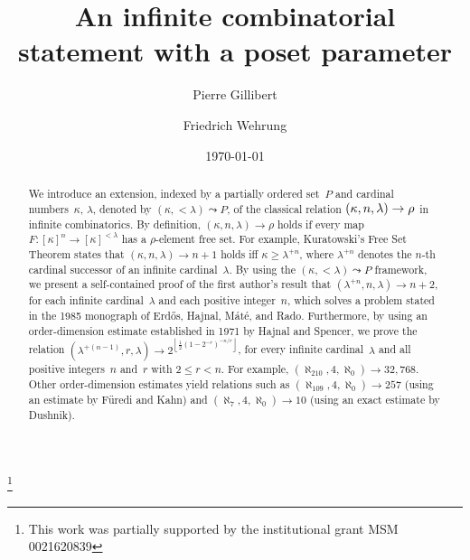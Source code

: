\documentclass[psamsfonts,reqno]{amsart}
\theoremstyle{plain}
\theoremstyle{definition}
\theoremstyle{remark}
\numberwithin{equation}{section}
\numberwithin{figure}{section}
\newcommand{\gk}{\kappa}
\newcommand{\gl}{\lambda}
\newcommand{\gr}{\rho}
\newcommand{\intgr}[1]{\left\lfloor{#1}\right\rfloor}
\begin{document}
\title{An infinite combinatorial statement with a poset parameter}

\author[P.~Gillibert]{Pierre Gillibert}
\author[F.~Wehrung]{Friedrich Wehrung}
\address{LMNO, CNRS UMR 6139\\
D\'epartement de Math\'ematiques, BP 5186\\
Universit\'e de Caen, Campus 2\\
14032 Caen cedex\\
France}


\date{\today}



\thanks{This work was partially supported by the institutional grant MSM 0021620839}

\begin{abstract}
We introduce an extension, indexed by a partially ordered set~$P$ and cardinal numbers~$\gk$, $\gl$, denoted by $(\gk,{<}\gl)\leadsto P$, of the classical relation $(\gk,n,\gl)\rightarrow\nobreak\rho$ in infinite combinatorics. By definition, $(\gk,n,\gl)\rightarrow\gr$ holds if every map $F\colon[\gk]^n\to[\gk]^{<\gl}$ has a $\gr$-element free set. For example, Kuratowski's Free Set Theorem states that $(\gk,n,\gl)\rightarrow n+1$ holds if{f} $\gk\geq\gl^{+n}$, where $\gl^{+n}$ denotes the $n$-th cardinal successor of an infinite cardinal~$\gl$. By using the $(\gk,{<}\gl)\leadsto P$ framework, we present a self-contained proof of the first author's result that $(\gl^{+n},n,\gl)\rightarrow n+2$, for each infinite cardinal~$\gl$ and each positive integer~$n$, which solves a problem stated in the 1985 monograph of Erd\H{o}s, Hajnal, M\'at\'e, and Rado. Furthermore, by using an order-dimension estimate established in 1971 by Hajnal and Spencer, we prove the relation $(\gl^{+(n-1)},r,\gl)\rightarrow2^{\intgr{\frac{1}{2}(1-2^{-r})^{-n/r}}}$, for every infinite cardinal~$\gl$ and all positive integers~$n$ and~$r$ with $2\leq r<n$. For example, $(\aleph_{210},4,\aleph_0)\rightarrow 32{,}768$. Other order-dimension estimates yield relations such as $(\aleph_{109},4,\aleph_0)\rightarrow 257$ (using an estimate by F\"uredi and Kahn) and $(\aleph_7,4,\aleph_0)\rightarrow 10$ (using an exact estimate by Dushnik).
\end{abstract}
\end{document}
